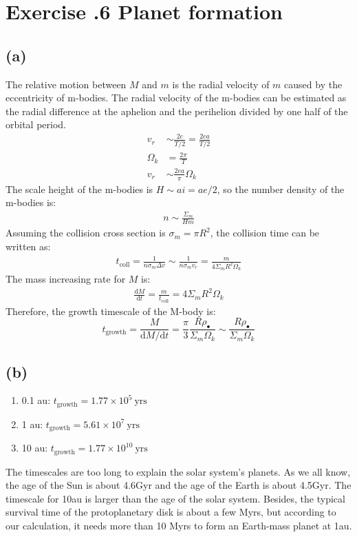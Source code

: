 \documentclass[a4paper,12pt]{article}
\renewcommand{\d}{\mathrm{d}}
\begin{document}
\section*{\textbf{Exercise \uppercase\expandafter{}.6 Planet formation}}
\subsection*{(a)}
The relative motion between $M$ and $m$ is the radial velocity of $m$ caused by the eccentricity of m-bodies.
The radial velocity of the m-bodies can be estimated as the radial difference at the aphelion and the  perihelion 
divided by one half of the orbital period.
\begin{align*}
    v_r &\sim  \frac{2c}{T/2} = \frac{2ea}{T/2} \\
    \Omega_k &= \frac{2\pi}{T} \\
    v_r &\sim \frac{2ea}{\pi } \Omega_k
\end{align*}
The scale height of the m-bodies is $H \sim ai = ae/2$, so the number density of the m-bodies is:
\begin{align*}
    n \sim \frac{\Sigma_m}{H m}
\end{align*}
Assuming the collision cross section is $\sigma_m = \pi R^2$, the collision time can be written as:
\begin{align*}
    t_\text{coll} = \frac{1}{n\sigma_m \Delta v} \sim \frac{1}{n\sigma_m v_r} = \frac{m}{4\Sigma_m R^2 \Omega_k}
\end{align*}
The mass increasing rate for $M$ is:
\begin{align*}
    \frac{\d M}{\d t} = \frac{m}{t_\text{coll}} = 4 \Sigma_m R^2 \Omega_k
\end{align*}
Therefore, the growth timescale of the M-body is:
\begin{equation*}
    t_\text{growth} = \frac{M}{\d M/\d t} = \frac{\pi}{3} \frac{R \rho_\bullet }{\Sigma_m \Omega_k} \sim \frac{R \rho_\bullet }{\Sigma_m \Omega_k}
\end{equation*}

\subsection*{(b)}
\begin{enumerate}
    \item[] 0.1 au: $t_\text{growth} = 1.77 \times 10^5 \ \text{yrs}$
    \item[] 1 au: $t_\text{growth} = 5.61 \times 10^7 \ \text{yrs}$ 
    \item[] 10 au: $t_\text{growth} = 1.77 \times 10^{10} \ \text{yrs}$ 
\end{enumerate}
The timescales are too long to explain the solar system's planets. As we all know, 
the age of the Sun is about 4.6Gyr and the age of the Earth is about 4.5Gyr. 
The timescale for 10au is larger than the age of the solar system.
Besides, the typical survival time of the protoplanetary disk is about a few Myrs, but 
according to our calculation, it needs more than 10 Myrs to form an Earth-mass planet at 1au.
\end{document}
